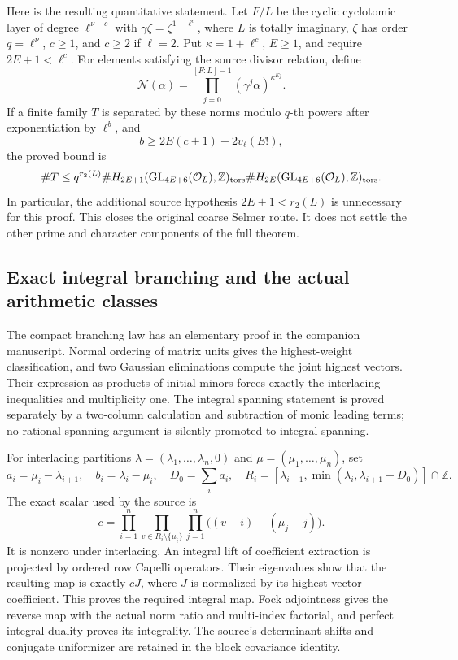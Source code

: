 \documentclass[11pt,a4paper]{article}
\theoremstyle{remark}
\newcommand{\Z}{\mathbb Z}
\begin{document}
Here is the resulting quantitative statement. Let $F/L$ be the
cyclic cyclotomic layer of degree $\ell^{\nu-c}$ with
$\gamma\zeta=\zeta^{1+\ell^c}$, where $L$ is totally imaginary,
$\zeta$ has order $q=\ell^\nu$, $c\ge1$, and $c\ge2$ if
$\ell=2$. Put $\kappa=1+\ell^c$, $E\ge1$, and require
$2E+1<\ell^c$. For elements satisfying the source divisor relation,
define
\[
             \mathcal N(\alpha)
                 =\prod_{j=0}^{[F:L]-1}(\gamma^j\alpha)^{\kappa^{Ej}}.
\]
If a finite family $T$ is separated by these norms modulo $q$-th
powers after exponentiation by $\ell^b$, and
\[
                  b\ge 2E(c+1)+2v_\ell(E!),
\]
the proved bound is
\[
 \#T\le q^{r_2(L)}
       \#H_{2E+1}(\operatorname{GL}_{4E+6}(\mathcal O_L),\Z)_{\rm tors}
       \#H_{2E}(\operatorname{GL}_{4E+6}(\mathcal O_L),\Z)_{\rm tors}.
\]
In particular, the additional source hypothesis
$2E+1<r_2(L)$ is unnecessary for this proof. This closes the original
coarse Selmer route. It does not settle the other prime and character
components of the full theorem.

\subsection{Exact integral branching and the actual arithmetic classes}

The compact branching law has an elementary proof in the companion
manuscript. Normal ordering of matrix units gives the highest-weight
classification, and two Gaussian eliminations compute the joint
highest vectors. Their expression as products of initial minors
forces exactly the interlacing inequalities and multiplicity one.
The integral spanning statement is proved separately by a two-column
calculation and subtraction of monic leading terms; no rational
spanning argument is silently promoted to integral spanning.

For interlacing partitions $\lambda=(\lambda_1,\ldots,\lambda_n,0)$
and $\mu=(\mu_1,\ldots,\mu_n)$, set
\[
 a_i=\mu_i-\lambda_{i+1},\quad b_i=\lambda_i-\mu_i,
 \quad D_0=\sum_i a_i,\quad
 R_i=[\lambda_{i+1},\min(\lambda_i,\lambda_{i+1}+D_0)]\cap\Z.
\]
The exact scalar used by the source is
\[
 c=\prod_{i=1}^n\prod_{v\in R_i\setminus\{\mu_i\}}
                      \prod_{j=1}^n\bigl((v-i)-(\mu_j-j)\bigr).
\]
It is nonzero under interlacing. An integral lift of coefficient
extraction is projected by ordered row Capelli operators. Their
eigenvalues show that the resulting map is exactly $cJ$, where $J$
is normalized by its highest-vector coefficient. This proves the
required integral map. Fock adjointness gives the reverse map with
the actual norm ratio and multi-index factorial, and perfect integral
duality proves its integrality. The source's determinant shifts and
conjugate uniformizer are retained in the block covariance identity.
\end{document}
